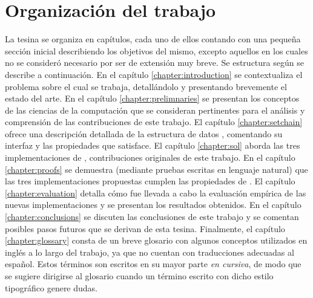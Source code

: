   \section{Organización del trabajo}
  La tesina se organiza en capítulos, cada uno de ellos contando con una pequeña sección inicial
  describiendo los objetivos del mismo, excepto aquellos en los cuales no se consideró necesario por
  ser de extensión muy breve.
  Se estructura según se describe a continuación.
  En el capítulo \ref{chapter:introduction} se
  contextualiza el problema sobre el cual se trabaja, detallándolo y presentando brevemente
  el estado del arte.
  En el capítulo \ref{chapter:prelimnaries} se presentan los conceptos de las ciencias de la computación que se
  consideran pertinentes para el análisis y comprensión de las contribuciones de este trabajo.
  El capítulo \ref{chapter:setchain} ofrece una descripción detallada de la estructura de datos \setchain,
  comentando su interfaz y las propiedades que satisface.
  El capítulo \ref{chapter:sol} aborda las tres implementaciones de \setchain, contribuciones originales
  de este trabajo.
  En el capítulo \ref{chapter:proofs} se demuestra (mediante pruebas escritas en lenguaje natural) que
  las tres implementaciones propuestas cumplen las propiedades de \setchain.
  El capítulo \ref{chapter:evaluation} detalla cómo fue llevada a cabo la evaluación empírica de las
  nuevas implementaciones y se presentan los resultados obtenidos.
  En el capítulo \ref{chapter:conclusions} se discuten las conclusiones de este trabajo y 
  se comentan posibles pasos futuros que se derivan de esta tesina.
  Finalmente, el capítulo \ref{chapter:glossary} consta de un breve glosario con algunos conceptos
  utilizados en inglés a lo largo del trabajo, ya que no cuentan con traducciones adecuadas al español.
  Estos términos son escritos en su mayor parte \textit{en cursiva}, de modo que se sugiere dirigirse
  al glosario cuando un término escrito con dicho estilo tipográfico genere dudas.


